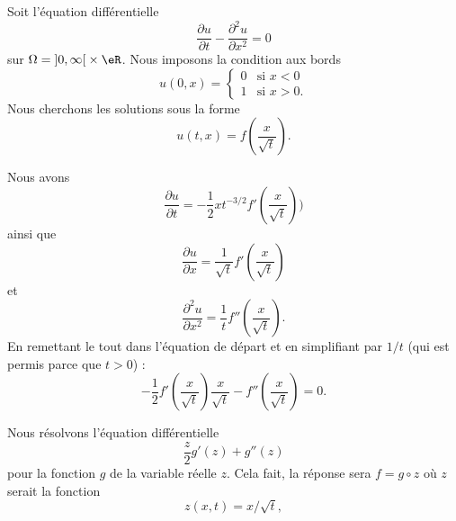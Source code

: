 Soit l'équation différentielle
\begin{equation}        \label{EQooPGDPooTjiVhB}
    \frac{ \partial u }{ \partial t }-\frac{ \partial^2u }{ \partial x^2 }=0
\end{equation}
sur \( \Omega=\mathopen] 0 , \infty \mathclose[\times \eR\). Nous imposons la condition aux bords
    \begin{equation}        \label{EQooJHPVooMkvODe}
    u(0,x)=\begin{cases}
        0    &   \text{si } x<0\\
        1    &    \text{si } x>0.
    \end{cases}
\end{equation}
Nous cherchons les solutions sous la forme
\begin{equation}
    u(t,x)=f\left( \frac{ x }{ \sqrt{ t } } \right).
\end{equation}

Nous avons
\begin{equation}
    \frac{ \partial u }{ \partial t }=-\frac{ 1 }{2}xt^{-3/2}f'\left( \frac{ x }{ \sqrt{ t } } \right))
\end{equation}
ainsi que
\begin{equation}
    \frac{ \partial u }{ \partial x }=\frac{1}{ \sqrt{ t } }f'\left( \frac{ x }{ \sqrt{ t } } \right)
\end{equation}
et
\begin{equation}
    \frac{ \partial^2u }{ \partial x^2 }=\frac{1}{ t }f''\left( \frac{ x }{ \sqrt{ t } } \right).
\end{equation}
En remettant le tout dans l'équation de départ et en simplifiant par \( 1/t\) (qui est permis parce que \( t>0\)) :
\begin{equation}        \label{EQooCRKIooYNhvaA}
    -\frac{ 1 }{2}f'\left( \frac{ x }{ \sqrt{ t } } \right)\frac{ x }{ \sqrt{ t } }-f''\left( \frac{ x }{ \sqrt{ t } } \right)=0.
\end{equation}

Nous résolvons l'équation différentielle
\begin{equation}        \label{EQooEFQPooGWVoUq}
    \frac{ z }{ 2 }g'(z)+g''(z)
\end{equation}
pour la fonction \( g\) de la variable réelle \( z\). Cela fait, la réponse sera \( f=g\circ z\) où \( z\) serait la fonction
\begin{equation}
    z(x,t)=x/\sqrt{ t },
\end{equation}

